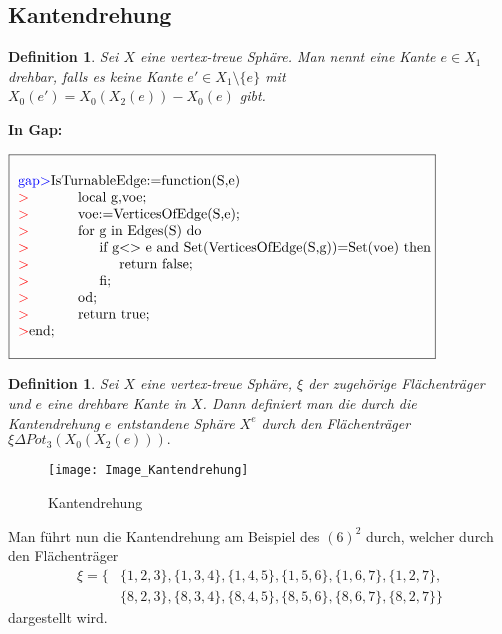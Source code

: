 \documentclass[12pt,titlepage,twoside,cleardoublepage]{article}
\theoremstyle{nummermitklammern}
\newtheorem{definition}[temp]{Definition}
\newtheorem{definition}[zahl]{Definition}
\numberwithin{equation}{section}
\begin{document}
\subsection{Kantendrehung}
\begin{definition}
Sei $X$ eine vertex-treue Sphäre. Man nennt eine Kante $e\in X_1$ \emph{drehbar}, falls es keine Kante $e'\in X_1\setminus \{e\}$ mit $X_0(e')=X_0(X_2(e))-X_0(e)$ gibt.
\end{definition}
\textbf{In Gap:}
\begin{center}
$\fbox{
\parbox{14cm}{
\begin{tabbing}
\textcolor{blue}{gap$>$}IsTu\=rnableEdge:=function(S,e)\\
\textcolor{red}{$>$}\> local g,voe;\\
\textcolor{red}{$>$}\> voe:=VerticesOfEdge(S,e);\\
\textcolor{red}{$>$}\> for \=g in Edges(S) do\\
\textcolor{red}{$>$}\>\> if g\=$<>$ e and Set(VerticesOfEdge(S,g))=Set(voe) then\\
\textcolor{red}{$>$}\>\>\> return false;\\
\textcolor{red}{$>$}\>\> fi;\\
\textcolor{red}{$>$}\> od;\\
\textcolor{red}{$>$}\> return true;\\
\textcolor{red}{$>$}end;
\end{tabbing}
}}$
\end{center}
\begin{definition}
Sei $X$ eine vertex-treue Sphäre, $\xi$ der zugehörige Flächenträger und $e$ eine drehbare Kante in $X$. Dann definiert man die durch die Kantendrehung $e$ entstandene Sphäre $X^e$ durch den Flächenträger $\xi \Delta Pot_3(X_0(X_2(e))).$
\end{definition}
\begin{figure}[H]
\begin{center}
\texttt{[image: Image\_Kantendrehung]}
\end{center}
\caption{Kantendrehung}
\end{figure}
 Man führt nun die Kantendrehung am Beispiel des $(6)^2$  durch, welcher durch den Flächenträger
\begin{align*}
\xi=\{&\{1,2,3\},\{1,3,4\},\{1,4,5\},\{1,5,6\},\{1,6,7\},\{1,2,7\},\\ 
&\{8,2,3\},\{8,3,4\},\{8,4,5\},\{8,5,6\},\{8,6,7\},\{8,2,7\}\}
\end{align*}
dargestellt wird. 
\end{document}
